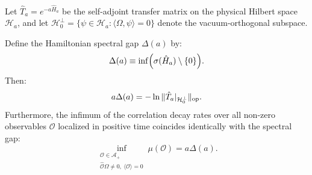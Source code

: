 \begin{theorem}
\label{thm:spectral_identification}
Let $\hat{T}_a = e^{-a \hat{H}_a}$ be the self-adjoint transfer matrix on the physical Hilbert space $\mathcal{H}_a$, and let $\mathcal{H}_0^\perp = \{ \psi \in \mathcal{H}_a : \langle \Omega, \psi \rangle = 0 \}$ denote the vacuum-orthogonal subspace.

Define the Hamiltonian spectral gap $\Delta(a)$ by:
\begin{equation}
\label{eq:hamiltonian_gap_def}
\Delta(a) \equiv \inf \Bigl( \sigma(\hat{H}_a) \setminus \{0\} \Bigr).
\end{equation}
Then:
\begin{equation}
\label{eq:spectral_gap_transfer_id}
a \Delta(a) = -\ln \|\hat{T}_a|_{\mathcal{H}_0^\perp}\|_{\mathrm{op}}.
\end{equation}
Furthermore, the infimum of the correlation decay rates over all non-zero observables $\mathcal{O}$ localized in positive time coincides identically with the spectral gap:
\begin{equation}
\label{eq:decay_rate_infimum_id}
\inf_{\substack{\mathcal{O} \in \mathcal{A}_+ \\ \hat{\mathcal{O}}\Omega \neq 0, \ \langle \mathcal{O} \rangle = 0}} \mu(\mathcal{O}) = a \Delta(a).
\end{equation}
\end{theorem}

